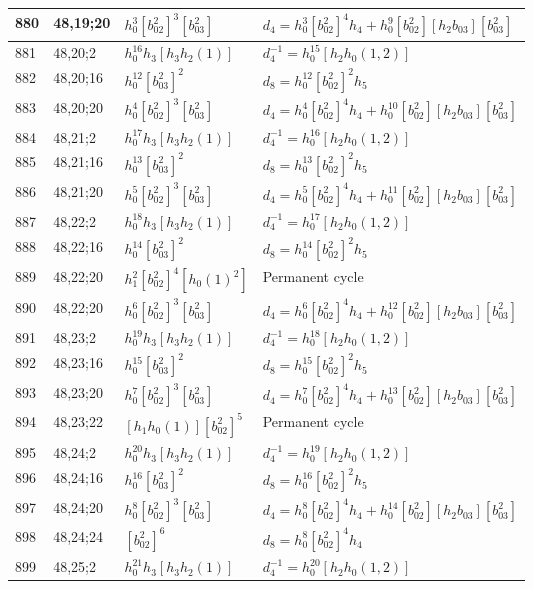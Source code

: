 \documentclass{article}
\begin{document}
\begin{longtable}{|l|l|>{\raggedright\arraybackslash}p{6cm}|>{\raggedright\arraybackslash}p{6cm}|}
\hline
880 & 48,19;20 & $h_0^3[b_{02}^2]^3[b_{03}^2]$ &$d_{4}=h_0^3[b_{02}^2]^4h_4 + h_0^9[b_{02}^2][h_2b_{03}][b_{03}^2]$\\
\hline
881 & 48,20;2 & $h_0^{16}h_3[h_3h_2(1)]$ & $d_{4}^{-1}=h_0^{15}[h_2h_0(1, 2)]$\\
\hline
882 & 48,20;16 & $h_0^{12}[b_{03}^2]^2$ &$d_{8}=h_0^{12}[b_{02}^2]^2h_5$\\
\hline
883 & 48,20;20 & $h_0^4[b_{02}^2]^3[b_{03}^2]$ &$d_{4}=h_0^4[b_{02}^2]^4h_4 + h_0^{10}[b_{02}^2][h_2b_{03}][b_{03}^2]$\\
\hline
884 & 48,21;2 & $h_0^{17}h_3[h_3h_2(1)]$ & $d_{4}^{-1}=h_0^{16}[h_2h_0(1, 2)]$\\
\hline
885 & 48,21;16 & $h_0^{13}[b_{03}^2]^2$ &$d_{8}=h_0^{13}[b_{02}^2]^2h_5$\\
\hline
886 & 48,21;20 & $h_0^5[b_{02}^2]^3[b_{03}^2]$ &$d_{4}=h_0^5[b_{02}^2]^4h_4 + h_0^{11}[b_{02}^2][h_2b_{03}][b_{03}^2]$\\
\hline
887 & 48,22;2 & $h_0^{18}h_3[h_3h_2(1)]$ & $d_{4}^{-1}=h_0^{17}[h_2h_0(1, 2)]$\\
\hline
888 & 48,22;16 & $h_0^{14}[b_{03}^2]^2$ &$d_{8}=h_0^{14}[b_{02}^2]^2h_5$\\
\hline
889 & 48,22;20 & $h_1^2[b_{02}^2]^4[h_0(1)^2]$ & Permanent cycle\\
890 & 48,22;20 & $h_0^6[b_{02}^2]^3[b_{03}^2]$ &$d_{4}=h_0^6[b_{02}^2]^4h_4 + h_0^{12}[b_{02}^2][h_2b_{03}][b_{03}^2]$\\
\hline
891 & 48,23;2 & $h_0^{19}h_3[h_3h_2(1)]$ & $d_{4}^{-1}=h_0^{18}[h_2h_0(1, 2)]$\\
\hline
892 & 48,23;16 & $h_0^{15}[b_{03}^2]^2$ &$d_{8}=h_0^{15}[b_{02}^2]^2h_5$\\
\hline
893 & 48,23;20 & $h_0^7[b_{02}^2]^3[b_{03}^2]$ &$d_{4}=h_0^7[b_{02}^2]^4h_4 + h_0^{13}[b_{02}^2][h_2b_{03}][b_{03}^2]$\\
\hline
894 & 48,23;22 & $[h_1h_0(1)][b_{02}^2]^5$ & Permanent cycle\\
\hline
895 & 48,24;2 & $h_0^{20}h_3[h_3h_2(1)]$ & $d_{4}^{-1}=h_0^{19}[h_2h_0(1, 2)]$\\
\hline
896 & 48,24;16 & $h_0^{16}[b_{03}^2]^2$ &$d_{8}=h_0^{16}[b_{02}^2]^2h_5$\\
\hline
897 & 48,24;20 & $h_0^8[b_{02}^2]^3[b_{03}^2]$ &$d_{4}=h_0^8[b_{02}^2]^4h_4 + h_0^{14}[b_{02}^2][h_2b_{03}][b_{03}^2]$\\
\hline
898 & 48,24;24 & $[b_{02}^2]^6$ &$d_{8}=h_0^8[b_{02}^2]^4h_4$\\
\hline
899 & 48,25;2 & $h_0^{21}h_3[h_3h_2(1)]$ & $d_{4}^{-1}=h_0^{20}[h_2h_0(1, 2)]$\\

\end{longtable}
\end{document}
